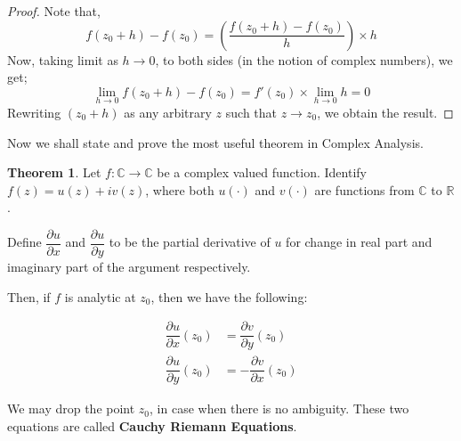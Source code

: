 \documentclass[12pt]{article}
\newcommand{\R}{\mathbb{R}}
\newcommand{\C}{\mathbb{C}}
\theoremstyle{definition}
\newtheorem{thm}{Theorem}
\newenvironment{theorem}{
\begin{tcolorbox}[colback=green!5!white,colframe=green!75!black, parbox = false]\begin{thm} }{\end{thm}\end{tcolorbox} }
\begin{document}
\begin{proof}
    Note that, 
    $$f(z_0+h) - f(z_0) = \left(\dfrac{f(z_0+h) - f(z_0)}{h}\right) \times h$$
    Now, taking limit as $h \rightarrow 0$, to both sides (in the notion of complex numbers), we get;
    $$\lim_{h \rightarrow 0} f(z_0+h) - f(z_0) = f'(z_0) \times \lim_{h\rightarrow 0}h = 0$$
    Rewriting $(z_0 + h)$ as any arbitrary $z$ such that $z\rightarrow z_0$, we obtain the result.
\end{proof}

Now we shall state and prove the most useful theorem in Complex Analysis.

\begin{theorem}
    Let $f:\C \rightarrow \C$ be a complex valued function. Identify $f(z) = u(z) + i v(z)$, where both $u(\cdot)$ and $v(\cdot)$ are functions from $\C$ to $\R$. 
    
    Define $\dfrac{\partial u}{\partial x}$ and $\dfrac{\partial u}{\partial y}$ to be the partial derivative of $u$ for change in real part and imaginary part of the argument respectively.
    
    Then, if $f$ is analytic at $z_0$, then we have the following:
    
    \begin{align}
        \dfrac{\partial u}{\partial x}(z_0) & =\dfrac{\partial v}{\partial y}(z_0)\\
        \dfrac{\partial u}{\partial y}(z_0) &=-\dfrac{\partial v}{\partial x}(z_0)
    \end{align}
    
    We may drop the point $z_0$, in case when there is no ambiguity. These two equations are called \textbf{Cauchy Riemann Equations}.
\end{theorem}
\end{document}
